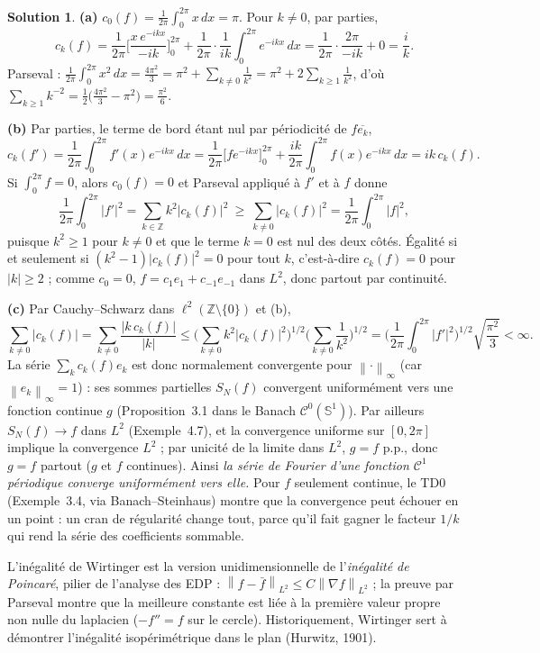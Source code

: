 \documentclass[11pt,a4paper]{article}
\newcommand{\Z}{\mathbb{Z}}
\newcommand{\Sun}{\mathbb{S}^1}
\newcommand{\norm}[1]{\left\|#1\right\|}
\newcommand{\Cz}{\mathcal{C}^0}
\newcommand{\ie}{c'est-à-dire}
\theoremstyle{definition}
\newtheorem*{solution}{Solution}
\begin{document}
\begin{solution}
\noindent\textbf{(a)} $c_0(f)=\frac1{2\pi}\int_0^{2\pi}x\,dx=\pi$. Pour $k\ne0$, par parties,
\[
c_k(f)=\frac1{2\pi}\Big[\frac{x\,e^{-ikx}}{-ik}\Big]_0^{2\pi}+\frac1{2\pi}\cdot\frac1{ik}\int_0^{2\pi}e^{-ikx}\,dx=\frac1{2\pi}\cdot\frac{2\pi}{-ik}+0=\frac ik .
\]
Parseval : $\frac1{2\pi}\int_0^{2\pi}x^2\,dx=\frac{4\pi^2}3=\pi^2+\sum_{k\ne0}\frac1{k^2}=\pi^2+2\sum_{k\ge1}\frac1{k^2}$, d'où $\sum_{k\ge1}k^{-2}=\frac12\big(\frac{4\pi^2}3-\pi^2\big)=\frac{\pi^2}6$.

\medskip
\noindent\textbf{(b)} Par parties, le terme de bord étant nul par périodicité de $f\overline{e_k}$,
\[
c_k(f')=\frac1{2\pi}\int_0^{2\pi}f'(x)e^{-ikx}\,dx=\frac1{2\pi}\big[f e^{-ikx}\big]_0^{2\pi}+\frac{ik}{2\pi}\int_0^{2\pi}f(x)e^{-ikx}\,dx=ik\,c_k(f).
\]
Si $\int_0^{2\pi}f=0$, alors $c_0(f)=0$ et Parseval appliqué à $f'$ et à $f$ donne
\[
\frac1{2\pi}\int_0^{2\pi}|f'|^2=\sum_{k\in\Z}k^2|c_k(f)|^2\ \ge\ \sum_{k\ne0}|c_k(f)|^2=\frac1{2\pi}\int_0^{2\pi}|f|^2 ,
\]
puisque $k^2\ge1$ pour $k\ne0$ et que le terme $k=0$ est nul des deux côtés. Égalité si et seulement si $(k^2-1)|c_k(f)|^2=0$ pour tout $k$, \ie{} $c_k(f)=0$ pour $|k|\ge2$ ; comme $c_0=0$, $f=c_1e_1+c_{-1}e_{-1}$ dans $L^2$, donc partout par continuité.

\medskip
\noindent\textbf{(c)} Par Cauchy--Schwarz dans $\ell^2(\Z\setminus\{0\})$ et (b),
\[
\sum_{k\ne0}|c_k(f)|=\sum_{k\ne0}\frac{|k\,c_k(f)|}{|k|}\le\Big(\sum_{k\ne0}k^2|c_k(f)|^2\Big)^{1/2}\Big(\sum_{k\ne0}\frac1{k^2}\Big)^{1/2}=\Big(\frac1{2\pi}\int_0^{2\pi}|f'|^2\Big)^{1/2}\sqrt{\frac{\pi^2}3}<\infty .
\]
La série $\sum_kc_k(f)e_k$ est donc normalement convergente pour $\norm\cdot_\infty$ (car $\norm{e_k}_\infty=1$) : ses sommes partielles $S_N(f)$ convergent uniformément vers une fonction continue $g$ (Proposition~3.1 dans le Banach $\Cz(\Sun)$). Par ailleurs $S_N(f)\to f$ dans $L^2$ (Exemple~4.7), et la convergence uniforme sur $[0,2\pi]$ implique la convergence $L^2$ ; par unicité de la limite dans $L^2$, $g=f$ p.p., donc $g=f$ partout ($g$ et $f$ continues). Ainsi \emph{la série de Fourier d'une fonction $\mathcal C^1$ périodique converge uniformément vers elle.} Pour $f$ seulement continue, le TD0 (Exemple~3.4, via Banach--Steinhaus) montre que la convergence peut échouer en un point : un cran de régularité change tout, parce qu'il fait gagner le facteur $1/k$ qui rend la série des coefficients sommable.
\end{solution}

\begin{commentaire}
L'inégalité de Wirtinger est la version unidimensionnelle de l'\emph{inégalité de Poincaré}, pilier de l'analyse des EDP : $\norm{f-\bar f}_{L^2}\le C\norm{\nabla f}_{L^2}$ ; la preuve par Parseval montre que la meilleure constante est liée à la première valeur propre non nulle du laplacien ($-f''=f$ sur le cercle). Historiquement, Wirtinger sert à démontrer l'inégalité isopérimétrique dans le plan (Hurwitz, 1901).
\end{commentaire}
\end{document}
